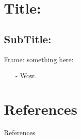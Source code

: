 \documentclass[9pt]{beamer}
\begin{document}
	\section[Title]{Title:}

	\subsection[SubTitle]{SubTitle:}
	\begin{frame}{Frame:}
		something here:
		\begin{itemize}
			\item[-] Wow.
		\end{itemize}
	\end{frame}



	
	\section*{References}
	\begin{frame}[allowframebreaks]{References}
		
		
	\end{frame}
	
\end{document}
